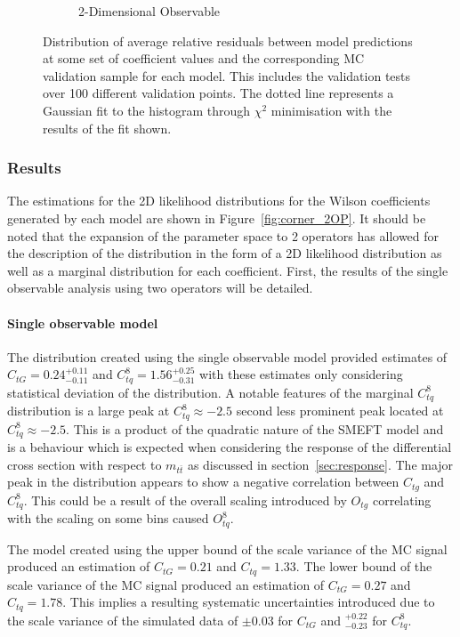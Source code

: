 \documentclass[a4paper,11pt]{article}
\begin{document}
\begin{figure}[H]
\begin{subfigure}[b]{0.4\textwidth}
        \caption{2-Dimensional Observable}
    \end{subfigure}
    \caption{Distribution of average relative residuals between model predictions at some set of coefficient values and the corresponding MC validation sample for each model. This includes the validation tests over 100 different validation points. The dotted line represents a Gaussian fit to the histogram through $\chi^2$ minimisation with the results of the fit shown.}
    \label{fig:residuals_hist}
\end{figure}

\subsubsection{Results}

The estimations for the 2D likelihood distributions for the Wilson coefficients generated by each model are shown in Figure~\ref{fig:corner_2OP}.
It should be noted that the expansion of the parameter space to 2 operators has allowed for the description of the distribution in the form of a 2D likelihood distribution as well as a marginal distribution for each coefficient.
First, the results of the single observable analysis using two operators will be detailed.

\paragraph{Single observable model}

The distribution created using the single observable model provided estimates of $C_{tG}=0.24^{+0.11}_{-0.11}$ and $C_{tq}^{8}=1.56^{+0.25}_{-0.31}$ with these estimates only considering statistical deviation of the distribution.
A notable features of the marginal $C_{tq}^{8}$ distribution is a large peak at $C_{tq}^{8}\approx-2.5$ second less prominent peak located at $C_{tq}^{8}\approx-2.5$.
This is a product of the quadratic nature of the SMEFT model and is a behaviour which is expected when considering the response of the differential cross section with respect to $m_{t\bar{t}}$ as discussed in section~\ref{sec:response}.
The major peak in the distribution appears to show a negative correlation between $C_{tg}$ and $C_{tq}^8$.
This could be a result of the overall scaling introduced by $O_{tg}$ correlating with the scaling on some bins caused $O_{tq}^{8}$.

The model created using the upper bound of the scale variance of the MC signal produced an estimation of $C_{tG}=0.21$ and $C_{tq}=1.33$.
The lower bound of the scale variance of the MC signal produced an estimation of $C_{tG}=0.27$ and $C_{tq}=1.78$.
This implies a resulting systematic uncertainties introduced due to the scale variance of the simulated data of $\pm 0.03$ for $C_{tG}$ and $^{+0.22}_{-0.23}$ for $C_{tq}^{8}$.
\end{document}
